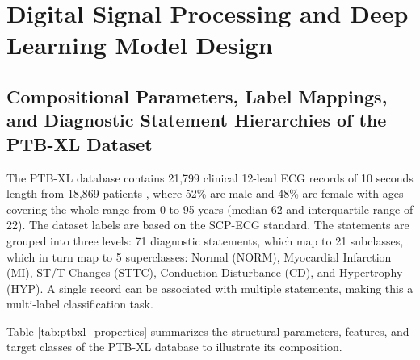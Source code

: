 \documentclass[12pt,a4paper]{report}
\begin{document}
\clearpage

\chapter{Digital Signal Processing and Deep Learning Model Design}

\section{Compositional Parameters, Label Mappings, and Diagnostic Statement Hierarchies of the PTB-XL Dataset}
The PTB-XL database contains 21,799 clinical 12-lead ECG records of 10 seconds length from 18,869 patients \cite{wagner2020ptbxl}, where 52\% are male and 48\% are female with ages covering the whole range from 0 to 95 years (median 62 and interquartile range of 22). The dataset labels are based on the SCP-ECG standard. The statements are grouped into three levels: 71 diagnostic statements, which map to 21 subclasses, which in turn map to 5 superclasses: Normal (NORM), Myocardial Infarction (MI), ST/T Changes (STTC), Conduction Disturbance (CD), and Hypertrophy (HYP). A single record can be associated with multiple statements, making this a multi-label classification task. 

Table \ref{tab:ptbxl_properties} summarizes the structural parameters, features, and target classes of the PTB-XL database to illustrate its composition.
\end{document}

